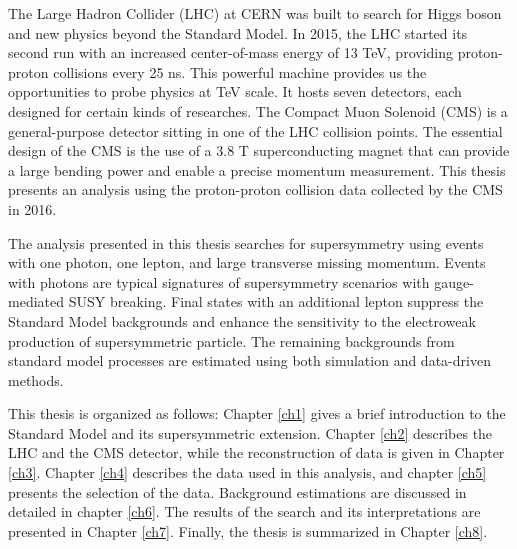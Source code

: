 \documentclass[12pt,oneside]{memoir}
\begin{document}
The Large Hadron Collider (LHC) at CERN was built to search for Higgs boson and new physics beyond the Standard Model.
In 2015, the LHC started its second run with an increased center-of-mass energy of 13 TeV, providing proton-proton collisions every 25 ns. 
This powerful machine provides us the opportunities to probe physics at TeV scale. 
It hosts seven detectors, each designed for certain kinds of researches. 
The Compact Muon Solenoid (CMS) is a general-purpose detector sitting in one of the LHC collision points. 
The essential design of the CMS is the use of a 3.8 T superconducting magnet that can provide a large bending power and enable a precise momentum measurement. 
This thesis presents an analysis using the proton-proton collision data collected by the CMS in 2016. 

The analysis presented in this thesis searches for supersymmetry using events with one photon, one lepton, and large transverse missing momentum.  
Events with photons are typical signatures of supersymmetry scenarios with gauge-mediated SUSY breaking.
Final states with an additional lepton suppress the Standard Model backgrounds and enhance the sensitivity to the electroweak production of supersymmetric particle.
The remaining backgrounds from standard model processes are estimated using both simulation and data-driven methods. 

This thesis is organized as follows: Chapter \ref{ch1} gives a brief introduction to the Standard Model and its supersymmetric extension. Chapter \ref{ch2} describes the LHC and the CMS detector, while the reconstruction of data is given in Chapter \ref{ch3}. Chapter \ref{ch4} describes the data used in this analysis, and chapter  \ref{ch5} presents the selection of the data. Background estimations are discussed in detailed in chapter \ref{ch6}. The results of the search and its interpretations are presented in Chapter \ref{ch7}. Finally, the thesis is summarized in Chapter \ref{ch8}.

 









\newpage


\end{document}
